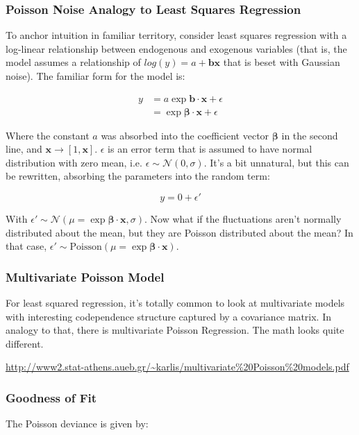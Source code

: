 \subsubsection{Poisson Noise Analogy to Least Squares Regression}
To anchor intuition in familiar territory, consider least squares regression with a log-linear relationship between endogenous and exogenous variables (that is, the model assumes a relationship of $log(y)=a + \mathbf{bx}$ that is beset with Gaussian noise). The familiar form for the model is:

\begin{equation}
\begin{array}{rl}
y &= a\exp{\mathbf{b \cdot x}} + \epsilon \\
&= \exp\mathbf{\beta \cdot x} + \epsilon
\end{array}
\end{equation}

Where the constant $a$ was absorbed into the coefficient vector $\mathbf{\beta}$ in the second line, and $\mathbf{x} \rightarrow [1,\mathbf{x}]$. $\epsilon$ is an error term that is assumed to have normal distribution with zero mean, i.e. $\epsilon \sim \mathscr{N}(0,\sigma)$. It's a bit unnatural, but this can be rewritten, absorbing the parameters into the random term:

\begin{equation}
y = 0 + \epsilon'
\end{equation}

With $\epsilon' \sim \mathscr{N}(\mu = \exp{\mathbf{\beta \cdot x}},\sigma)$. Now what if the fluctuations aren't normally distributed about the mean, but they are Poisson distributed about the mean? In that case, $\epsilon' \sim \mathrm{Poisson}(\mu = \exp{\mathbf{\beta \cdot x}})$. 



\subsubsection{Multivariate Poisson Model}
For least squared regression, it's totally common to look at multivariate models with interesting codependence structure captured by a covariance matrix. In analogy to that, there is multivariate Poisson Regression. The math looks quite different. 

\url{http://www2.stat-athens.aueb.gr/~karlis/multivariate%20Poisson%20models.pdf}

\subsubsection{Goodness of Fit}
The Poisson deviance is given by:

